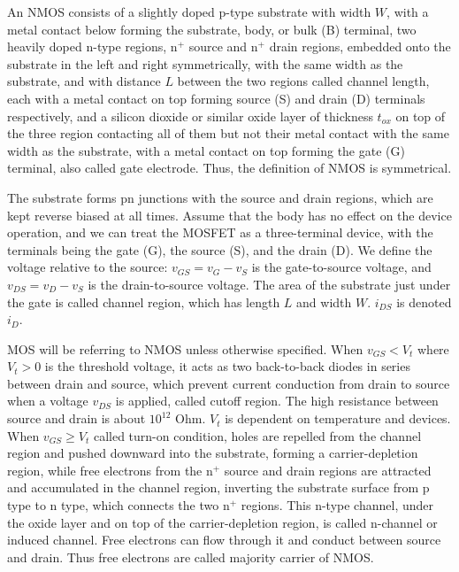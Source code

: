 \documentclass[a4paper,12pt]{report}
\begin{document}
An NMOS consists of a slightly doped p-type substrate with width $W$, with a metal contact below forming the substrate, body, or bulk (B) terminal, two heavily doped n-type regions, n$^+$ source and n$^+$ drain regions, embedded onto the substrate in the left and right symmetrically, with the same width as the substrate, and with distance $L$ between the two regions called channel length, each with a metal contact on top forming source (S) and drain (D) terminals respectively, and a silicon dioxide  or similar oxide layer of thickness $t_{ox}$ on top of the three region contacting all of them but not their metal contact with the same width as the substrate, with a metal contact on top forming the gate (G) terminal, also called gate electrode. Thus, the definition of NMOS is symmetrical.

The substrate forms pn junctions with the source and drain regions, which are kept reverse biased at all times. Assume that the body has no effect on the device operation, and we can treat the MOSFET as a three-terminal device, with the terminals being the gate (G), the source (S), and the drain (D). We define the voltage relative to the source: $v_{GS}=v_G-v_S$ is the gate-to-source voltage, and $v_{DS}=v_D-v_S$ is the drain-to-source voltage. The area of the substrate just under the gate is called channel region, which has length $L$ and width $W$. $i_{DS}$ is denoted $i_D$.

MOS will be referring to NMOS unless otherwise specified.
When $v_{GS}<V_t$ where $V_t>0$ is the threshold voltage, it acts as two back-to-back diodes in series between drain and source, which prevent current conduction from drain to source when a voltage $v_{DS}$ is applied, called cutoff region. The high resistance between source and drain is about $10^{12}$ Ohm. $V_t$ is dependent on temperature and devices.
When $v_{GS}\ge V_t$ called turn-on condition, holes are repelled from the channel region and pushed downward into the substrate, forming a carrier-depletion region, while free electrons from the n$^+$ source and drain regions are attracted and accumulated in the channel region, inverting the substrate surface from p type to n type, which connects the two n$^+$ regions. This n-type channel, under the oxide layer and on top of the carrier-depletion region, is called n-channel or induced channel. Free electrons can flow through it and conduct between source and drain. Thus free electrons are called majority carrier of NMOS.
\end{document}
